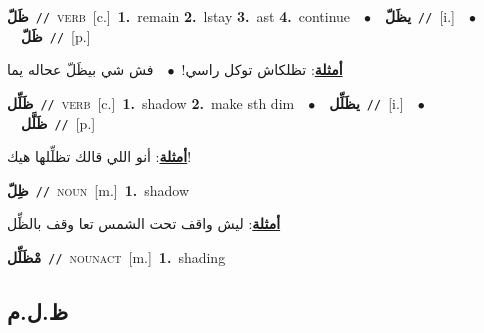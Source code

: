 \documentclass[10pt,a4paper,twoside]{article} %
\begin{document}
\begin{multicols}{2}
{{{\setlength\topsep{0pt}\textbf{\foreignlanguage{arabic}{ظَلّ}}\ {\color{gray}\texttt{//}\color{black}}\ \textsc{verb}\ [c.]\ \textbf{1.}~remain  \textbf{2.}~lstay  \textbf{3.}~ast  \textbf{4.}~continue\ \ $\bullet$\ \ \setlength\topsep{0pt}\textbf{\foreignlanguage{arabic}{يظَلّ}}\ {\color{gray}\texttt{//}\color{black}}\ [i.]\ \ $\bullet$\ \ \setlength\topsep{0pt}\textbf{\foreignlanguage{arabic}{ظَلّ}}\ {\color{gray}\texttt{//}\color{black}}\ [p.]\  \begin{flushright}\color{gray}\foreignlanguage{arabic}{\textbf{\underline{\foreignlanguage{arabic}{أمثلة}}}: تظلكاش توكل راسي!\ $\bullet$\ \  فش شي بيظَلّ عحاله يما}\end{flushright}\color{black}} \vspace{2mm}

{\setlength\topsep{0pt}\textbf{\foreignlanguage{arabic}{ظَلِّل}}\ {\color{gray}\texttt{//}\color{black}}\ \textsc{verb}\ [c.]\ \textbf{1.}~shadow  \textbf{2.}~make sth dim\ \ $\bullet$\ \ \setlength\topsep{0pt}\textbf{\foreignlanguage{arabic}{يظَلِّل}}\ {\color{gray}\texttt{//}\color{black}}\ [i.]\ \ $\bullet$\ \ \setlength\topsep{0pt}\textbf{\foreignlanguage{arabic}{ظَلَّل}}\ {\color{gray}\texttt{//}\color{black}}\ [p.]\  \begin{flushright}\color{gray}\foreignlanguage{arabic}{\textbf{\underline{\foreignlanguage{arabic}{أمثلة}}}: أنو اللي قالك تظلِّلها هيك!}\end{flushright}\color{black}} \vspace{2mm}

{\setlength\topsep{0pt}\textbf{\foreignlanguage{arabic}{ظِلّ}}\ {\color{gray}\texttt{//}\color{black}}\ \textsc{noun}\ [m.]\ \textbf{1.}~shadow\  \begin{flushright}\color{gray}\foreignlanguage{arabic}{\textbf{\underline{\foreignlanguage{arabic}{أمثلة}}}: ليش واقف تحت الشمس تعا وقف بالظِّل}\end{flushright}\color{black}} \vspace{2mm}

{\setlength\topsep{0pt}\textbf{\foreignlanguage{arabic}{مْظَلِّل}}\ {\color{gray}\texttt{//}\color{black}}\ \textsc{noun\textunderscore act}\ [m.]\ \textbf{1.}~shading\ 

\vspace{-3mm}
\subsection*{\color{blue}\foreignlanguage{arabic}{ظ.ل.م}\color{blue}{}} 

}}}
\end{multicols}
\end{document}
